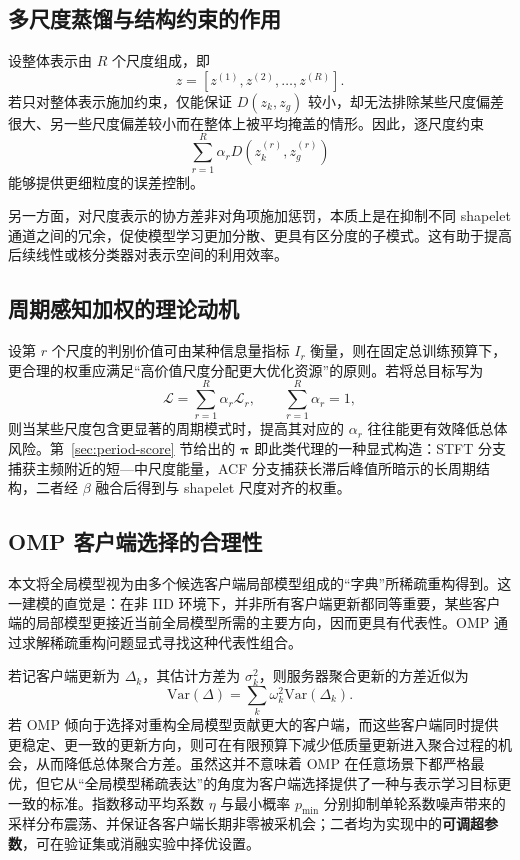 \documentclass{article}
\begin{document}
\subsection{多尺度蒸馏与结构约束的作用}

设整体表示由 $R$ 个尺度组成，即
\begin{equation}
z=[z^{(1)},z^{(2)},\dots,z^{(R)}].
\end{equation}
若只对整体表示施加约束，仅能保证 $D(z_k,z_g)$ 较小，却无法排除某些尺度偏差很大、另一些尺度偏差较小而在整体上被平均掩盖的情形。因此，逐尺度约束
\begin{equation}
\sum_{r=1}^{R}\alpha_r D\!\left(z_k^{(r)}, z_g^{(r)}\right)
\end{equation}
能够提供更细粒度的误差控制。

另一方面，对尺度表示的协方差非对角项施加惩罚，本质上是在抑制不同 shapelet 通道之间的冗余，促使模型学习更加分散、更具有区分度的子模式。这有助于提高后续线性或核分类器对表示空间的利用效率。

\subsection{周期感知加权的理论动机}

设第 $r$ 个尺度的判别价值可由某种信息量指标 $I_r$ 衡量，则在固定总训练预算下，更合理的权重应满足“高价值尺度分配更大优化资源”的原则。若将总目标写为
\begin{equation}
\mathcal{L}=\sum_{r=1}^{R}\alpha_r \mathcal{L}_r,\qquad \sum_{r=1}^{R}\alpha_r=1,
\end{equation}
则当某些尺度包含更显著的周期模式时，提高其对应的 $\alpha_r$ 往往能更有效降低总体风险。第~\ref{sec:period-score} 节给出的 $\bm{\pi}$ 即此类代理的一种显式构造：STFT 分支捕获主频附近的短—中尺度能量，ACF 分支捕获长滞后峰值所暗示的长周期结构，二者经 $\beta$ 融合后得到与 shapelet 尺度对齐的权重。

\subsection{OMP 客户端选择的合理性}

本文将全局模型视为由多个候选客户端局部模型组成的“字典”所稀疏重构得到。这一建模的直觉是：在非 IID 环境下，并非所有客户端更新都同等重要，某些客户端的局部模型更接近当前全局模型所需的主要方向，因而更具有代表性\cite{secompfl,folb,updateaware}。OMP 通过求解稀疏重构问题显式寻找这种代表性组合。

若记客户端更新为 $\Delta_k$，其估计方差为 $\sigma_k^2$，则服务器聚合更新的方差近似为
\begin{equation}
\mathrm{Var}(\Delta)=\sum_{k} \omega_k^2 \mathrm{Var}(\Delta_k).
\end{equation}
若 OMP 倾向于选择对重构全局模型贡献更大的客户端，而这些客户端同时提供更稳定、更一致的更新方向，则可在有限预算下减少低质量更新进入聚合过程的机会，从而降低总体聚合方差。虽然这并不意味着 OMP 在任意场景下都严格最优，但它从“全局模型稀疏表达”的角度为客户端选择提供了一种与表示学习目标更一致的标准。指数移动平均系数 $\eta$ 与最小概率 $p_{\min}$ 分别抑制单轮系数噪声带来的采样分布震荡、并保证各客户端长期非零被采机会；二者均为实现中的\textbf{可调超参数}，可在验证集或消融实验中择优设置。
\end{document}
